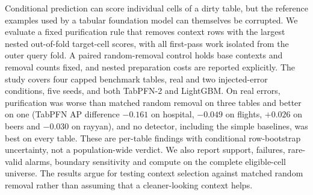 Conditional prediction can score individual cells of a dirty table, but the
reference examples used by a tabular foundation model can themselves be corrupted.
We evaluate a fixed purification rule that removes context rows with the largest
nested out-of-fold target-cell scores, with all first-pass work isolated from the
outer query fold. A paired random-removal control holds base contexts and removal
counts fixed, and nested preparation costs are reported explicitly. The study covers
four capped benchmark tables, real and two injected-error conditions, five seeds,
and both TabPFN-2 and LightGBM. On real errors, purification was worse than matched
random removal on three tables and better on one (TabPFN AP difference $-0.161$
on hospital, $-0.049$ on flights, $+0.026$ on beers and $-0.030$ on rayyan), and no detector,
including the simple baselines, was best on every table. These are per-table
findings with conditional row-bootstrap uncertainty, not a population-wide verdict.
We also report support, failures, rare-valid alarms, boundary sensitivity and
compute on the complete eligible-cell universe. The results argue for testing
context selection against matched random removal rather than assuming that a
cleaner-looking context helps.
